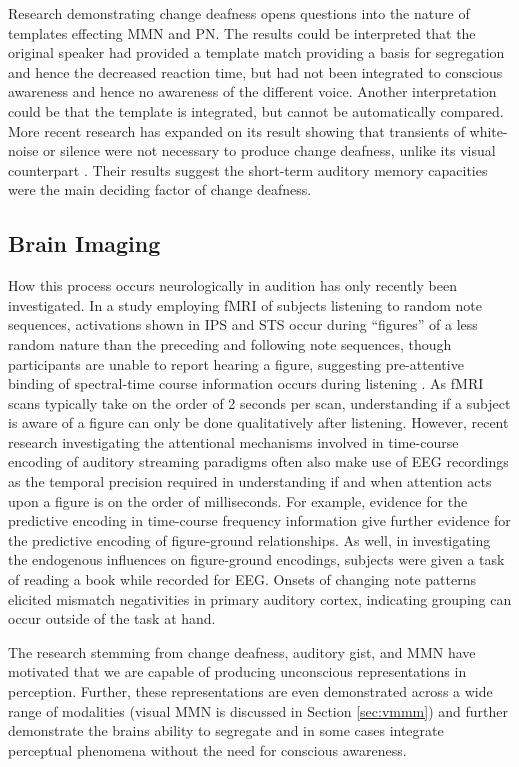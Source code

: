 Research demonstrating change deafness opens questions into the nature of templates effecting MMN and PN.  The results could be interpreted that the original speaker had provided a template match providing a basis for segregation and hence the decreased reaction time, but had not been integrated to conscious awareness and hence no awareness of the different voice.  Another interpretation could be that the template is integrated, but cannot be automatically compared.  More recent research has expanded on its result showing that transients of white-noise or silence were not necessary to produce change deafness, unlike its visual counterpart \cite{TURATTO2008}.  Their results suggest the short-term auditory memory capacities were the main deciding factor of change deafness.  

\subsection{Brain Imaging}

How this process occurs neurologically in audition has only recently been investigated. In a study employing fMRI of subjects listening to random note sequences, activations shown in IPS and STS occur during ``figures'' of a less random nature than the preceding and following note sequences, though participants are unable to report hearing a figure, suggesting pre-attentive binding of spectral-time course information occurs during listening \cite{Teki2011a}. As fMRI scans typically take on the order of 2 seconds per scan, understanding if a subject is aware of a figure can only be done qualitatively after listening.  However, recent research investigating the attentional mechanisms involved in time-course encoding of auditory streaming paradigms often also make use of EEG recordings as the temporal precision required in understanding if and when attention acts upon a figure is on the order of milliseconds.  For example, evidence for the predictive encoding in time-course frequency information \cite{Winkler2009} give further evidence for the predictive encoding of figure-ground relationships.  As well, in investigating the endogenous influences on figure-ground encodings, subjects were given a task of reading a book while recorded for EEG.  Onsets of changing note patterns elicited mismatch negativities in primary auditory cortex, indicating grouping can occur outside of the task at hand.

The research stemming from change deafness, auditory gist, and MMN have motivated that we are capable of producing unconscious representations in perception.  Further, these representations are even demonstrated across a wide range of modalities (visual MMN is discussed in Section \ref{sec:vmmm}) and further demonstrate the brains ability to segregate and in some cases integrate perceptual phenomena without the need for conscious awareness.  


